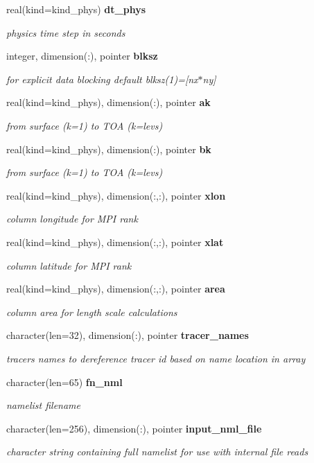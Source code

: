 \begin{DoxyCompactItemize}
real(kind=kind\+\_\+phys) \textbf{ dt\+\_\+phys}
\begin{DoxyCompactList}\small\item\em physics time step in seconds \end{DoxyCompactList}\item 
integer, dimension(\+:), pointer \textbf{ blksz}
\begin{DoxyCompactList}\small\item\em for explicit data blocking default blksz(1)=[nx$\ast$ny] \end{DoxyCompactList}\item 
real(kind=kind\+\_\+phys), dimension(\+:), pointer \textbf{ ak}
\begin{DoxyCompactList}\small\item\em from surface (k=1) to T\+OA (k=levs) \end{DoxyCompactList}\item 
real(kind=kind\+\_\+phys), dimension(\+:), pointer \textbf{ bk}
\begin{DoxyCompactList}\small\item\em from surface (k=1) to T\+OA (k=levs) \end{DoxyCompactList}\item 
real(kind=kind\+\_\+phys), dimension(\+:,\+:), pointer \textbf{ xlon}
\begin{DoxyCompactList}\small\item\em column longitude for M\+PI rank \end{DoxyCompactList}\item 
real(kind=kind\+\_\+phys), dimension(\+:,\+:), pointer \textbf{ xlat}
\begin{DoxyCompactList}\small\item\em column latitude for M\+PI rank \end{DoxyCompactList}\item 
real(kind=kind\+\_\+phys), dimension(\+:,\+:), pointer \textbf{ area}
\begin{DoxyCompactList}\small\item\em column area for length scale calculations \end{DoxyCompactList}\item 
character(len=32), dimension(\+:), pointer \textbf{ tracer\+\_\+names}
\begin{DoxyCompactList}\small\item\em tracers names to dereference tracer id based on name location in array \end{DoxyCompactList}\item 
character(len=65) \textbf{ fn\+\_\+nml}
\begin{DoxyCompactList}\small\item\em namelist filename \end{DoxyCompactList}\item 
character(len=256), dimension(\+:), pointer \textbf{ input\+\_\+nml\+\_\+file}
\begin{DoxyCompactList}\small\item\em character string containing full namelist for use with internal file reads \end{DoxyCompactList}\end{DoxyCompactItemize}
